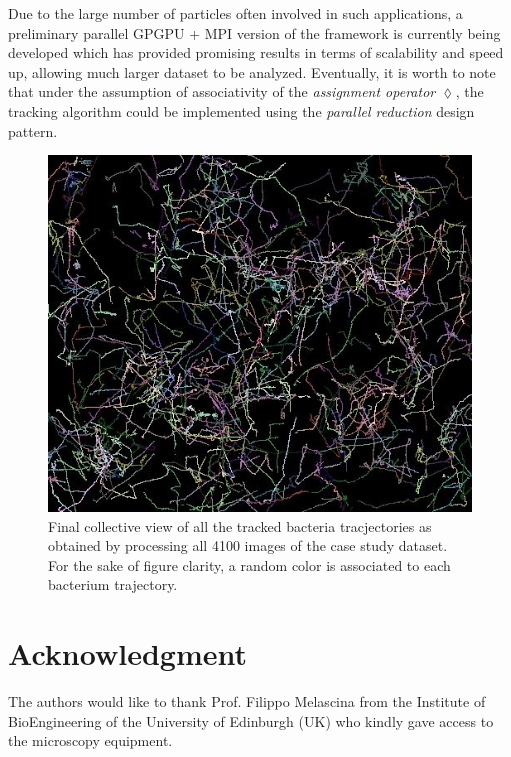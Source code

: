 \documentclass[conference]{IEEEtran}
\begin{document}
Due to the large number of particles often involved in such applications, a preliminary parallel GPGPU + MPI version of the framework is currently being developed which has provided promising results in terms of scalability and speed up, allowing much larger dataset to be analyzed. Eventually, it is worth to note that under the assumption of associativity of the \textit{assignment operator} $\lozenge$, the tracking algorithm could be implemented using the \textit{parallel reduction} design pattern.
    \begin{figure}
      \begin{center}
        \includegraphics[scale=0.5]{./images/result.png}
        \caption{Final collective view of all the tracked bacteria tracjectories as obtained by processing all 4100 images of the case study dataset. For the sake of figure clarity, a random color is associated to each bacterium trajectory.}\label{result}
      \end{center}
    \end{figure}



\section*{Acknowledgment}
The authors would like to thank Prof. Filippo Melascina from the Institute of BioEngineering of the University of Edinburgh (UK) who kindly gave access to the microscopy equipment.
\end{document}
